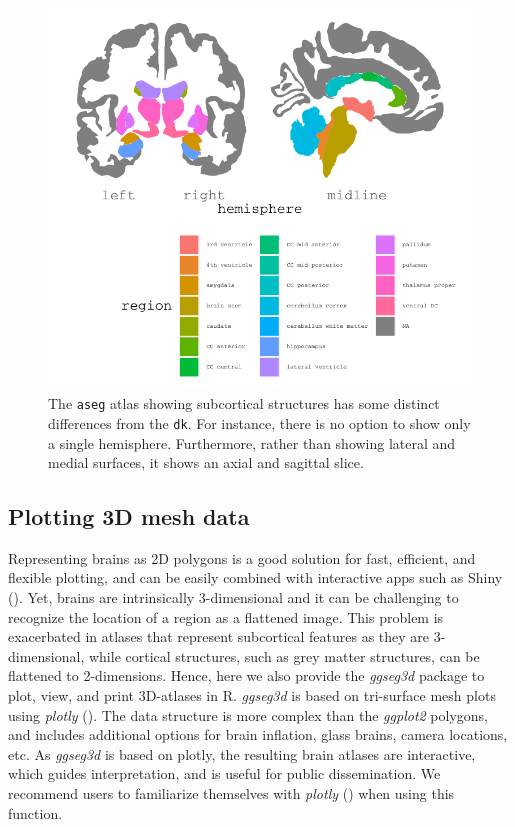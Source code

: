 \documentclass[fleqn,10pt]{wlpeerj} %
\begin{document}
\begin{figure}
\centering
\includegraphics{msc_ggseg_files/figure-latex/figure6-1.pdf}
\caption{\label{fig:figure6}The \texttt{aseg} atlas showing subcortical structures has some distinct differences from the \texttt{dk}. For instance, there is no option to show only a single hemisphere. Furthermore, rather than showing lateral and medial surfaces, it shows an axial and sagittal slice.}
\end{figure}

\hypertarget{plotting-3d-mesh-data}{%
\subsection{Plotting 3D mesh data}\label{plotting-3d-mesh-data}}

Representing brains as 2D polygons is a good solution for fast, efficient, and flexible plotting, and can be easily combined with interactive apps such as Shiny (\citet{shiny}).
Yet, brains are intrinsically 3-dimensional and it can be challenging to recognize the location of a region as a flattened image.
This problem is exacerbated in atlases that represent subcortical features as they are 3-dimensional, while cortical structures, such as grey matter structures, can be flattened to 2-dimensions.
Hence, here we also provide the \emph{ggseg3d} package to plot, view, and print 3D-atlases in R.
\emph{ggseg3d} is based on tri-surface mesh plots using \emph{plotly} (\citet{plotly}).
The data structure is more complex than the \emph{ggplot2} polygons, and includes additional options for brain inflation, glass brains, camera locations, etc.
As \emph{ggseg3d} is based on plotly, the resulting brain atlases are interactive, which guides interpretation, and is useful for public dissemination.
We recommend users to familiarize themselves with \emph{plotly} (\citet{plotly}) when using this function.
\end{document}
